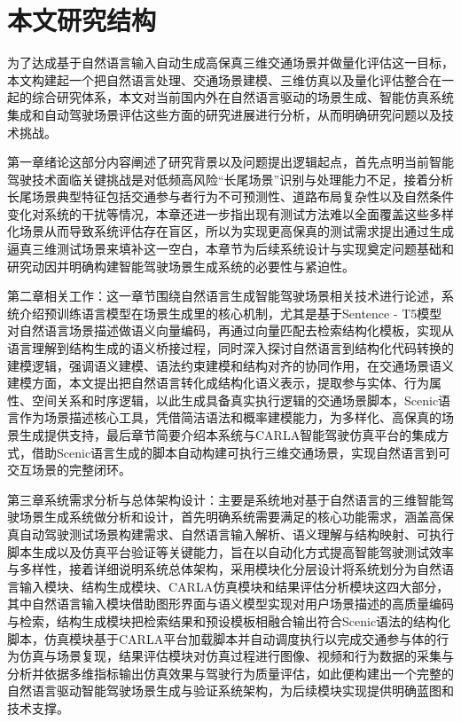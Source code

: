 \section{本文研究结构}

为了达成基于自然语言输入自动生成高保真三维交通场景并做量化评估这一目标，本文构建起一个把自然语言处理、交通场景建模\cite{du2025scene}、三维仿真以及量化评估整合在一起的综合研究体系，本文对当前国内外在自然语言驱动的场景生成、智能仿真系统集成和自动驾驶场景评估这些方面的研究进展进行分析，从而明确研究问题以及技术挑战。

第一章绪论这部分内容阐述了研究背景以及问题提出逻辑起点，首先点明当前智能驾驶技术面临关键挑战是对低频高风险“长尾场景”识别与处理能力不足，接着分析长尾场景典型特征包括交通参与者行为不可预测性、道路布局复杂性以及自然条件变化对系统的干扰等情况，本章还进一步指出现有测试方法难以全面覆盖这些多样化场景从而导致系统评估存在盲区，所以为实现更高保真的测试需求提出通过生成逼真三维测试场景来填补这一空白，本章节为后续系统设计与实现奠定问题基础和研究动因并明确构建智能驾驶场景生成系统的必要性与紧迫性。

第二章相关工作：这一章节围绕自然语言生成智能驾驶场景相关技术进行论述，系统介绍预训练语言模型在场景生成里的核心机制，尤其是基于Sentence - T5模型对自然语言场景描述做语义向量编码，再通过向量匹配去检索结构化模板，实现从语言理解到结构生成的语义桥接过程，同时深入探讨自然语言到结构化代码转换的建模逻辑，强调语义建模、语法约束建模和结构对齐的协同作用，在交通场景语义建模方面，本文提出把自然语言转化成结构化语义表示，提取参与实体、行为属性、空间关系和时序逻辑，以此生成具备真实执行逻辑的交通场景脚本，Scenic语言作为场景描述核心工具，凭借简洁语法和概率建模能力，为多样化、高保真的场景生成提供支持，最后章节简要介绍本系统与CARLA智能驾驶仿真平台的集成方式，借助Scenic语言生成的脚本自动构建可执行三维交通场景，实现自然语言到可交互场景的完整闭环。

第三章系统需求分析与总体架构设计：主要是系统地对基于自然语言的三维智能驾驶场景生成系统做分析和设计，首先明确系统需要满足的核心功能需求，涵盖高保真自动驾驶测试场景构建需求、自然语言输入解析、语义理解与结构映射、可执行脚本生成以及仿真平台验证等关键能力，旨在以自动化方式提高智能驾驶测试效率与多样性，接着详细说明系统总体架构，采用模块化分层设计将系统划分为自然语言输入模块、结构生成模块、CARLA仿真模块和结果评估分析模块这四大部分，其中自然语言输入模块借助图形界面与语义模型实现对用户场景描述的高质量编码与检索，结构生成模块把检索结果和预设模板相融合输出符合Scenic语法的结构化脚本，仿真模块基于CARLA平台加载脚本并自动调度执行以完成交通参与体的行为仿真与场景复现，结果评估模块对仿真过程进行图像、视频和行为数据的采集与分析并依据多维指标输出仿真效果与驾驶行为质量评估，如此便构建出一个完整的自然语言驱动智能驾驶场景生成与验证系统架构，为后续模块实现提供明确蓝图和技术支撑。

